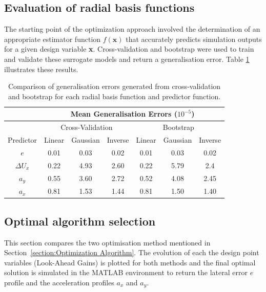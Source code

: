 \documentclass[conf]{new-aiaa}
\begin{document}
\subsection{Evaluation of radial basis functions}
The starting point of the optimization approach involved the determination of an appropriate estimator function $f(\textbf{x})$ that accurately predicts simulation outputs for a given design variable \textbf{x}. Cross-validation and bootstrap were used to train and validate these surrogate models and return a generalisation error. Table \ref{tab:cv_bs_rbf} illustrates these results.
\begin{table}[H]
  \centering
\begin{tabular}{|c|c c c|c c c|}
 \hline
 \cline{2-7} & \multicolumn{6}{|c|}{Mean Generalisation Errors ($10^{-5}$)}\\
 \hline
 \cline{2-7} & \multicolumn{3}{|c|}{Cross-Validation} & \multicolumn{3}{|c|}{Bootstrap}\\
 \hline
  Predictor &Linear & Gaussian & Inverse & Linear & Gaussian & Inverse \\ [0.5ex] 
 \hline
 $e$ & 0.01 & 0.03 & 0.02 & 0.01 & 0.03 & 0.02\\
 \hline
 $\Delta U_x$ & 0.22 & 4.93 & 2.60 & 0.22 & 5.79 & 2.4\\
 \hline
 $a_y$ & 0.55 & 3.60 & 2.72 & 0.52 & 4.08 & 2.45\\
 \hline
 $a_x$ & 0.81 & 1.53 & 1.44 & 0.81 & 1.50 & 1.40\\ [0.5ex] 
 \hline
\end{tabular}
\vspace{2.5mm}
\caption{\label{tab:cv_bs_rbf}Comparison of generalisation errors generated from cross-validation and bootstrap for each radial basis function and predictor function.}
\end{table}
\vspace{-10mm}


\subsection{Optimal algorithm selection}
This section compares the two optimisation method mentioned in Section~\ref{section:Optimization Algorithm}. The evolution of each the design point variables (Look-Ahead Gains) is plotted for both methods and the final optimal solution is simulated in the MATLAB environment to return the lateral error $e$ profile and the acceleration profiles $a_x$ and $a_y$.
\end{document}
